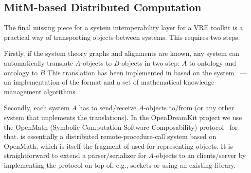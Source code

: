 \subsection{MitM-based Distributed Computation}\label{sec:mitm:comms}

The final missing piece for a system interoperability layer for a VRE toolkit is a practical way of transporting objects between systems.
This requires two steps.

Firstly, if the system theory graphs and alignments are known, any system can automatically translate $A$-objects to $B$-objects in two step: $A$ to ontology and ontology to $B$
This translation has been implemented in \cite{MueRoYuRa:abtafs17} based on the \MMT system~\cite{Rabe:MAGMS13,uniformal:on} --- an implementation of the \OMMT format and a set of mathematical knowledge management algorithms.

Secondly, each system $A$ has to send/receive $A$-objects to/from \MMT (or any other system that implements the translations).
In the OpenDreamKit project we use the OpenMath \SCSCP (Symbolic Computation Software Composability) protocol~\cite{SCSCP-1.3} for that. 
\SCSCP is essentially a distributed remote-procedure-call system based on OpenMath, which is itself the fragment of \OMMT used for representing objects.
It is straightforward to extend a parser/serializer for $A$-objects to an \SCSCP clients/server by implementing the \SCSCP protocol on top of, e.g., sockets or using an existing \SCSCP library. 


